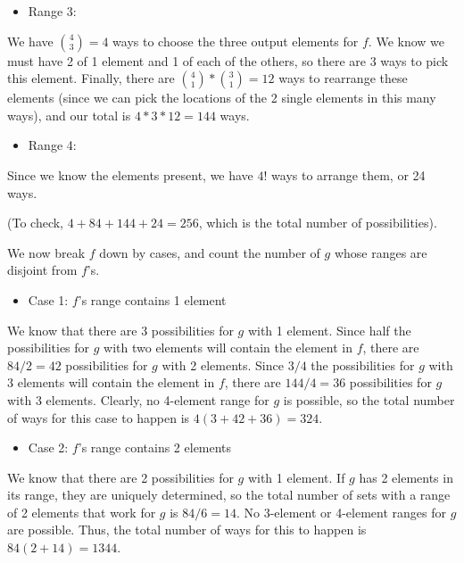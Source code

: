 \begin{enumerate}
 
            \begin{itemize}
        \item Range 3:
            \end{itemize}
            We have ${{4}\choose {3}} = 4$ ways to choose the three output elements for $f$. We know we must have 2 of 1 element and 1 of each of the others, so there are 3 ways to pick this element. Finally, there are ${{4}\choose{1}}*{{3}\choose{1}} = 12$ ways to rearrange these elements (since we can pick the locations of the 2 single elements in this many ways), and our total is $4 * 3 * 12 = 144$ ways.

 
            \begin{itemize}
        \item Range 4:
            \end{itemize}
            Since we know the elements present, we have $4!$ ways to arrange them, or 24 ways.

 (To check, $4 + 84 + 144 + 24 = 256$, which is the total number of possibilities).

 We now break $f$ down by cases, and count the number of $g$ whose ranges are disjoint from $f$'s.

 
            \begin{itemize}
        \item Case 1: $f$'s range contains 1 element
            \end{itemize}
            We know that there are 3 possibilities for $g$ with 1 element. Since half the possibilities for $g$ with two elements will contain the element in $f$, there are $84/2 = 42$ possibilities for $g$ with 2 elements. Since $3/4$ the possibilities for $g$ with 3 elements will contain the element in $f$, there are $144/4 = 36$ possibilities for $g$ with 3 elements. Clearly, no 4-element range for $g$ is possible, so the total number of ways for this case to happen is $4(3 + 42 + 36) = 324$.

 
            \begin{itemize}
        \item Case 2: $f$'s range contains 2 elements
            \end{itemize}
            We know that there are 2 possibilities for $g$ with 1 element. If $g$ has 2 elements in its range, they are uniquely determined, so the total number of sets with a range of 2 elements that work for $g$ is $84/6 = 14$. No 3-element or 4-element ranges for $g$ are possible. Thus, the total number of ways for this to happen is $84(2 + 14) = 1344$.


\end{enumerate}
